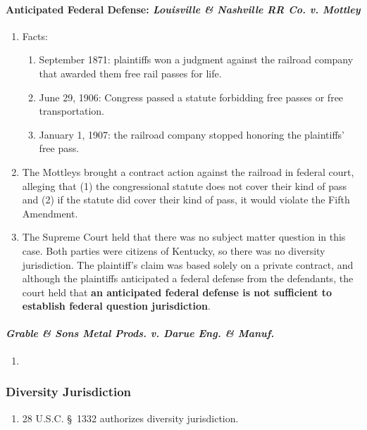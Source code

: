\paragraph{Anticipated Federal Defense: \emph{Louisville \& Nashville RR Co. v. Mottley}}

\begin{enumerate}
    \item Facts:
    \begin{enumerate}
        \item September 1871: plaintiffs won a judgment against the railroad company that awarded them free rail passes for life.
        \item June 29, 1906: Congress passed a statute forbidding free passes or free transportation.
        \item January 1, 1907: the railroad company stopped honoring the plaintiffs' free pass.
    \end{enumerate}
    \item The Mottleys brought a contract action against the railroad in federal court, alleging that (1) the congressional statute does not cover their kind of pass and (2) if the statute did cover their kind of pass, it would violate the Fifth Amendment.
    \item The Supreme Court held that there was no subject matter question in this case. Both parties were citizens of Kentucky, so there was no diversity jurisdiction. The plaintiff's claim was based solely on a private contract, and although the plaintiffs anticipated a federal defense from the defendants, the court held that \textbf{an anticipated federal defense is not sufficient to establish federal question jurisdiction}.
\end{enumerate}

\paragraph{\emph{Grable \& Sons Metal Prods. v. Darue Eng. \& Manuf.}}

\begin{enumerate}
    \item %
\end{enumerate}

\subsubsection{Diversity Jurisdiction}

\begin{enumerate}
    \item 28 U.S.C. \S\ 1332 authorizes diversity jurisdiction.
\end{enumerate}

